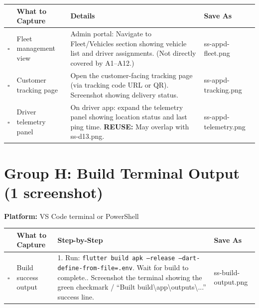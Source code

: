 \documentclass[11pt,a4paper]{article}
\newcommand{\checkbox}{$\square$\;}
\newcommand{\reuse}[1]{{\color{reuseorange}\textbf{REUSE:} #1}}
\newcommand{\filesave}[1]{{\ttfamily\small #1}}
\begin{document}
\begin{longtable}{@{}p{0.4cm} p{3.0cm} p{5.8cm} p{3.5cm}@{}}
  \toprule
  & \textbf{What to Capture} & \textbf{Details} & \textbf{Save As} \\
  \midrule

  \checkbox & Fleet management view &
    Admin portal: Navigate to Fleet/Vehicles section showing vehicle list and driver assignments.\newline
    (Not directly covered by A1--A12.) &
    \filesave{ss-appd-fleet.png} \\[6pt]

  \checkbox & Customer tracking page &
    Open the customer-facing tracking page (via tracking code URL or QR).\newline
    Screenshot showing delivery status. &
    \filesave{ss-appd-tracking.png} \\[6pt]

  \checkbox & Driver telemetry panel &
    On driver app: expand the telemetry panel showing location status and last ping time.\newline
    \reuse{May overlap with ss-d13.png.} &
    \filesave{ss-appd-telemetry.png} \\
  \bottomrule
\end{longtable}

\section{Group H: Build Terminal Output (1 screenshot)}

\textbf{Platform:} VS Code terminal or PowerShell

\begin{longtable}{@{}p{0.4cm} p{2.8cm} p{6.2cm} p{3.5cm}@{}}
  \toprule
  & \textbf{What to Capture} & \textbf{Step-by-Step} & \textbf{Save As} \\
  \midrule
  \checkbox & Build success output &
    1. Run: \texttt{flutter build apk --release --dart-define-from-file=.env}\newline
    2. Wait for build to complete.\newline
    3. Screenshot the terminal showing the green checkmark / ``Built build\textbackslash app\textbackslash outputs\textbackslash ...'' success line. &
    \filesave{ss-build-output.png} \\
  \bottomrule
\end{longtable}
\end{document}
